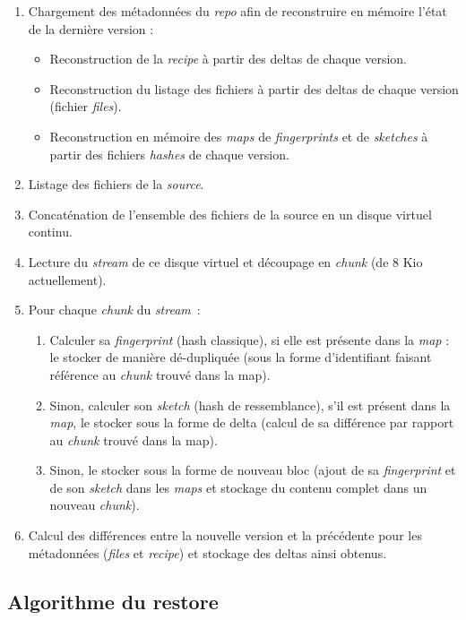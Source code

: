 \documentclass[a4paper]{article}
\begin{document}
\begin{enumerate}
\item
  Chargement des métadonnées du \emph{repo} afin de reconstruire en
  mémoire l'état de la dernière version :

  \begin{itemize}
  \item
    Reconstruction de la \emph{recipe} à partir des deltas de chaque
    version.
  \item
    Reconstruction du listage des fichiers à partir des deltas de chaque
    version (fichier \emph{files}).
  \item
    Reconstruction en mémoire des \emph{maps} de \emph{fingerprints} et
    de \emph{sketches} à partir des fichiers \emph{hashes} de chaque
    version.
  \end{itemize}
\item
  Listage des fichiers de la \emph{source}.
\item
  Concaténation de l'ensemble des fichiers de la source en un disque
  virtuel continu.
\item
  Lecture du \emph{stream} de ce disque virtuel et découpage en
  \emph{chunk} (de 8 Kio actuellement).
\item
  Pour chaque \emph{chunk} du \emph{stream}~:

  \begin{enumerate}
  \item
    Calculer sa \emph{fingerprint} (hash classique), si elle est
    présente dans la \emph{map} : le stocker de manière dé-dupliquée
    (sous la forme d'identifiant faisant référence au \emph{chunk}
    trouvé dans la map).
  \item
    Sinon, calculer son \emph{sketch} (hash de ressemblance), s'il est
    présent dans la \emph{map}, le stocker sous la forme de delta
    (calcul de sa différence par rapport au \emph{chunk} trouvé dans la
    map).
  \item
    Sinon, le stocker sous la forme de nouveau bloc (ajout de sa
    \emph{fingerprint} et de son \emph{sketch} dans les \emph{maps} et
    stockage du contenu complet dans un nouveau \emph{chunk}).
  \end{enumerate}
\item
  Calcul des différences entre la nouvelle version et la précédente pour
  les métadonnées (\emph{files} et \emph{recipe}) et stockage des deltas
  ainsi obtenus.
\end{enumerate}

\subsection{Algorithme du restore}
\end{document}
